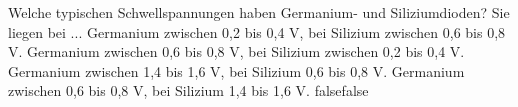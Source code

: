     {Welche typischen Schwellspannungen haben Germanium- und Siliziumdioden? Sie liegen bei ...}
    {Germanium zwischen 0,2 bis 0,4 V, bei Silizium zwischen 0,6 bis 0,8 V.}
    {Germanium zwischen 0,6 bis 0,8 V, bei Silizium zwischen 0,2 bis 0,4 V.}
    {Germanium zwischen 1,4 bis 1,6 V, bei Silizium 0,6 bis 0,8 V.}
    {Germanium zwischen 0,6 bis 0,8 V, bei Silizium 1,4 bis 1,6 V.}
    {false}{false}